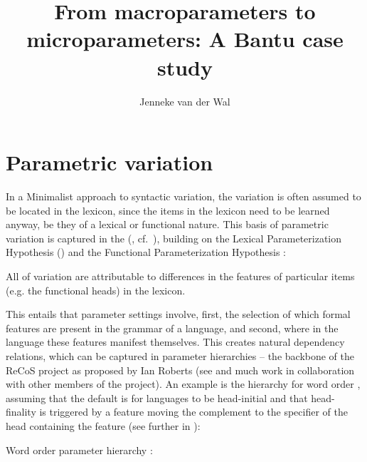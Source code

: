 \documentclass[output=paper]{langsci/langscibook}
\author{Jenneke van der Wal\affiliation{Leiden University}}
\title{From macroparameters to microparameters: A Bantu case study}
\begin{document}
\glsresetall

\section{Parametric variation}\label{bkm:Ref347925115}\label{sec:3.1}

In a Minimalist approach to syntactic variation, the variation is often assumed
to be located in the lexicon, since the items in the lexicon need to be learned
anyway, be they of a lexical or functional nature. This basis of parametric
variation is captured in the 
(\citealt[3]{Baker2008}, cf.\ \citealt{Borer1984,Chomsky1995}), building on the
Lexical Parameterization Hypothesis (\citealt{ManziniWexler1987}) and the
Functional Parameterization Hypothesis \citep{Fukui1995}:

\ea All  of variation are attributable to differences in the features
of particular items (e.g. the functional heads) in the lexicon.
\z

This entails that parameter settings involve, first, the selection of which
formal features are present in the grammar of a language, and second, where in
the language these features manifest themselves. This creates natural
dependency relations, which can be captured in parameter hierarchies – the
backbone of the ReCoS project as proposed by Ian Roberts (see
\citealt{RobHol2010,Roberts2012} and much work in
collaboration with other members of the project). An example is the hierarchy
for word order \citep{Roberts2012}, assuming that the default is for languages
to be head-initial \citep{Kayne1994} and that head-finality is triggered by a
feature moving the complement to the specifier of the head containing the
feature (see further in ):

\ea\label{ex:vdwal:3.2} Word order parameter hierarchy \citep{Roberts2012}:
\z
\end{document}
